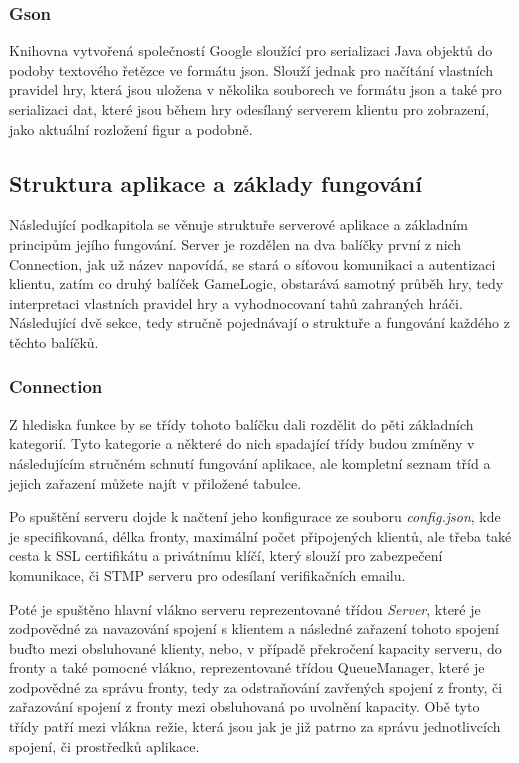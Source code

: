 \documentclass[12pt]{article}
\begin{document}
\subsubsection{Gson}
Knihovna vytvořená společností Google sloužící pro serializaci Java objektů do podoby textového řetězce ve formátu json. Slouží jednak pro načítání vlastních pravidel hry, která jsou uložena v několika souborech ve formátu json a také pro serializaci dat, které jsou během hry odesílaný serverem klientu pro zobrazení, jako aktuální rozložení figur a podobně.
\newpage
\subsection{Struktura aplikace a základy fungování}
Následující podkapitola se věnuje struktuře serverové aplikace a základním principům jejího fungování. Server je rozdělen na dva balíčky první z nich Connection, jak už název napovídá, se stará o síťovou komunikaci a autentizaci klientu, zatím co druhý balíček GameLogic, obstarává samotný průběh hry, tedy interpretaci vlastních pravidel hry a vyhodnocovaní tahů zahraných hráči. Následující dvě sekce, tedy stručně pojednávají o struktuře a fungování každého z těchto balíčků. 
\subsubsection{Connection}
Z hlediska funkce by se třídy tohoto balíčku dali rozdělit do pěti základních kategorií. Tyto kategorie a některé do nich spadající třídy budou zmíněny v následujícím stručném schnutí fungování aplikace, ale kompletní seznam tříd a jejich zařazení můžete najít v přiložené tabulce.

Po spuštění serveru dojde k načtení jeho konfigurace ze souboru \textit{config.json}, kde je specifikovaná, délka fronty, maximální počet připojených klientů, ale třeba také cesta k SSL certifikátu a privátnímu klíčí, který slouží pro zabezpečení komunikace, či STMP serveru pro odesílaní verifikačních emailu.

Poté je spuštěno hlavní vlákno serveru reprezentované třídou \textit{Server}, které je zodpovědné za navazování spojení s klientem a následné zařazení tohoto spojení buďto mezi obsluhované klienty, nebo, v případě překročení kapacity serveru, do fronty a také pomocné vlákno, reprezentované třídou \textit{}{QueueManager}, které je zodpovědné za správu fronty, tedy za odstraňování zavřených spojení z fronty, či zařazování spojení z fronty mezi obsluhovaná po uvolnění kapacity. Obě tyto třídy patří mezi vlákna režie, která jsou jak je již patrno za správu jednotlivcích spojení, či prostředků aplikace.
\end{document}
